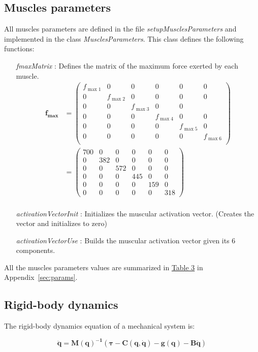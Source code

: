 \documentclass[pdftex,a4paper,11pt]{report}
\begin{document}
\subsection{Muscles parameters}
\label{sec:muscle_parameters}
All muscles parameters are defined in the file \textit{setupMusclesParameters} and implemented in the class \textit{MusclesParameters}.
This class defines the following functions:
\begin{itemize}
\item[\textit{fmaxMatrix}]: Defines the matrix of the maximum force exerted by each muscle.
\begin{align*}
\textbf{f}_\textbf{max}   & = \begin{pmatrix}
f_{\max1} &0&0&0&0&0\\
0& f_{\max2}&0&0&0&0\\
0&0& f_{\max3} &0&0\\
0&0&0& f_{\max4} &0&0\\
0&0&0&0& f_{\max5} &0\\
0&0&0&0&0& f_{\max6}\\
\end{pmatrix} \\& = \begin{pmatrix}
700 &0&0&0&0&0\\
 0&382&0&0&0&0\\
0&0 & 572 & 0&0&0\\
0&0&0&445 &0&0\\
0&0&0&0&159 &0\\
0&0&0&0&0&318
\end{pmatrix}\\
\end{align*}
\item[\textit{activationVectorInit}]: Initializes the muscular activation vector. (Creates the vector and initializes to zero)
\item[\textit{activationVectorUse}]: Builds the muscular activation vector given its 6 components.
\end{itemize}
All the muscles parameters values are summarized in \hyperref[MuscleParamTable]{Table 3} in Appendix~\ref{sec:params}.

\subsection{Rigid-body dynamics}
\label{sec:arm_dynamics}
The rigid-body dynamics equation of a mechanical system is:

 \begin{equation}
\label{eq:rbd}
    \boldsymbol{\ddot{q} = M(q)^{-1} (\tau - C(q, \dot{q}) - g(q)  - B \dot{q})} 
\end{equation}
\end{document}
